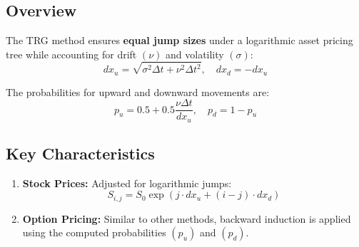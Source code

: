 \documentclass[11pt]{article}
\begin{document}
\subsection{Overview}\label{overview}

The TRG method ensures \textbf{equal jump sizes} under a logarithmic
asset pricing tree while accounting for drift \((\nu)\) and volatility
\((\sigma)\): \[
dx_u = \sqrt{\sigma^2 \Delta t + \nu^2 \Delta t^2}, \quad dx_d = -dx_u
\]

The probabilities for upward and downward movements are: \[
p_u = 0.5 + 0.5 \frac{\nu \Delta t}{dx_u}, \quad p_d = 1 - p_u
\]

\subsection{Key Characteristics}\label{key-characteristics}

\begin{enumerate}
\item
  \textbf{Stock Prices:} Adjusted for logarithmic jumps: \[
S_{i,j} = S_0 \exp\left(j \cdot dx_u + (i-j) \cdot dx_d\right)
\]
\item
  \textbf{Option Pricing:} Similar to other methods, backward induction
  is applied using the computed probabilities \((p_u)\) and \((p_d)\).
\end{enumerate}
\end{document}
